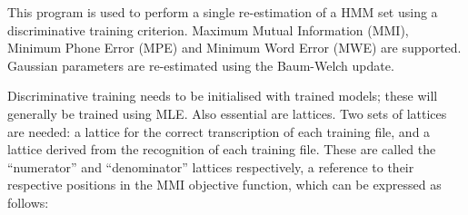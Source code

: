 %

%

\newpage
{}



This program is used to perform a single re-estimation of a HMM set using
a discriminative training criterion.  Maximum Mutual Information (MMI),
Minimum Phone Error (MPE) and  Minimum Word Error (MWE) are supported.
Gaussian parameters are re-estimated using the Baum-Welch update.  

Discriminative training needs to be initialised with trained models; these
will generally be trained using MLE.  Also essential are lattices.
Two sets of lattices are needed: a lattice for the correct transcription of
each training file, and a lattice derived from the recognition of each
training file.  These are called the ``numerator'' and ``denominator''
lattices respectively, a reference to their respective positions in the
MMI objective function, which can be expressed as follows:

